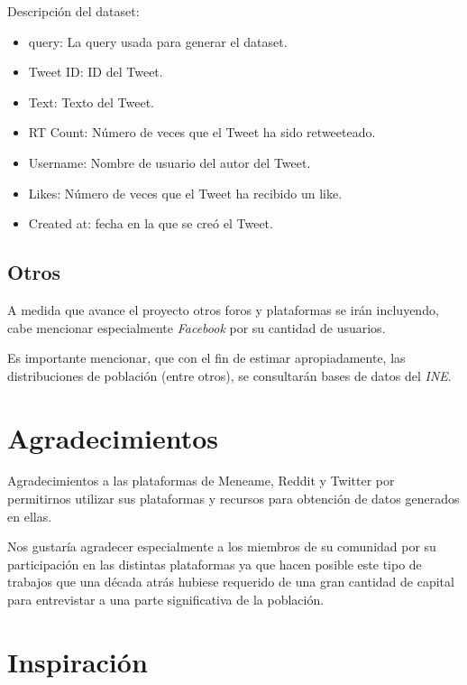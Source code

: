 \documentclass[a4paper,12pt]{article}
\begin{document}
Descripci\'on del dataset:

\begin{itemize}

\item query: La query usada para generar el dataset.

\item Tweet ID: ID del Tweet.

\item Text: Texto del Tweet.

\item RT Count: N\'umero de veces que el Tweet ha sido retweeteado.

\item Username: Nombre de usuario del autor del Tweet.

\item Likes: N\'umero de veces que el Tweet ha recibido un like.

\item Created at: fecha en la que se cre\'o el Tweet.

\end{itemize}

\subsection{Otros}

A medida que avance el proyecto otros foros y plataformas se ir\'an incluyendo, cabe mencionar especialmente {\itshape Facebook} por su cantidad de usuarios.

Es importante mencionar, que con el fin de estimar apropiadamente, las distribuciones de poblaci\'on (entre otros), se consultar\'an bases de datos del {\itshape INE}. 

\section{Agradecimientos}

Agradecimientos a las plataformas de Meneame, Reddit y Twitter por permitirnos utilizar sus plataformas y recursos para obtenci\'on de datos generados en ellas.

Nos gustar\'ia agradecer especialmente a los miembros de su comunidad por su participaci\'on en las distintas plataformas ya que hacen posible este tipo de trabajos que una d\'ecada atr\'as hubiese requerido de una gran cantidad de capital para entrevistar a una parte significativa de la poblaci\'on.

\section{Inspiraci\'on}
\end{document}
